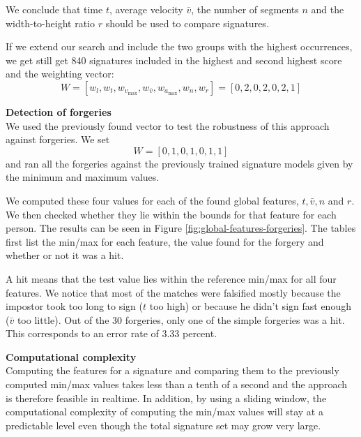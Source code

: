 \documentclass[a4paper, oneside]{csthesis}
\begin{document}
We conclude that time $t$, average velocity $\bar{v}$, the number of segments $n$ and the width-to-height ratio $r$ should be used to compare signatures.

If we extend our search and include the two groups with the highest occurrences, we get still get 840 signatures included in the highest and second highest score and the weighting vector:
$$W = [w_l, w_t, w_{v_\text{max}}, w_{\bar{v}}, w_{a_\text{max}}, w_n, w_r] = [0, 2, 0, 2, 0, 2, 1]$$


\textbf{Detection of forgeries}\\
We used the previously found vector to test the robustness of this approach against forgeries. We set $$W = [0, 1, 0, 1, 0, 1, 1]$$
and ran all the forgeries against the previously trained signature models given by the minimum and maximum values.

We computed these four values for each of the found global features, $t, \bar{v}, n$ and $r$. We then checked whether they lie within the bounds for that feature for each person. The results can be seen in Figure \ref{fig:global-features-forgeries}. The tables first list the min/max for each feature, the value found for the forgery and whether or not it was a hit.

A hit means that the test value lies within the reference min/max for all four features.
We notice that most of the matches were falsified mostly because the impostor took too long to sign ($t$ too high) or because he didn't sign fast enough ($\bar{v}$ too little). Out of the 30 forgeries, only one of the simple forgeries was a hit. This corresponds to an error rate of 3.33 percent.

\textbf{Computational complexity}\\
Computing the features for a signature and comparing them to the previously computed min/max values takes less than a tenth of a second and the approach is therefore feasible in realtime. In addition, by using a sliding window, the computational complexity of computing the min/max values will stay at a predictable level even though the total signature set may grow very large.
\end{document}
